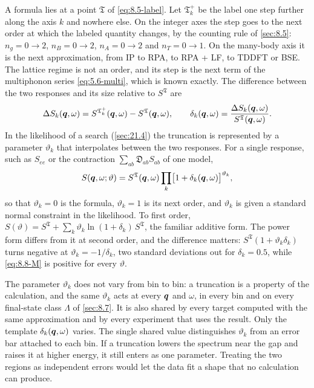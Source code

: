 A formula lies at a point $\mathfrak{T}$ of \cref{eq:8.5-label}. Let $\mathfrak{T}_k^+$ be the label one step further along the axis $k$ and nowhere else. On the integer axes the step goes to the next order at which the labeled quantity changes, by the counting rule of \cref{sec:8.5}: $n_g = 0 \to 2$, $n_B = 0 \to 2$, $n_A = 0 \to 2$ and $n_T = 0 \to 1$. On the many-body axis it is the next approximation, from IP to RPA, to RPA + LF, to TDDFT or BSE. The lattice regime is not an order, and its step is the next term of the multiphonon series \cref{eq:5.6-multi}, which is known exactly. The difference between the two responses and its size relative to $S^{\mathfrak{T}}$ are
\begin{equation}
  \Delta S_k(\bm{q},\omega) = S^{\mathfrak{T}_k^+}(\bm{q},\omega) - S^{\mathfrak{T}}(\bm{q},\omega) , \qquad
  \delta_k(\bm{q},\omega) = \frac{\Delta S_k(\bm{q},\omega)}{S^{\mathfrak{T}}(\bm{q},\omega)} .
  \label{eq:8.8-delta}
\end{equation}
In the likelihood of a search (\cref{sec:21.4}) the truncation is represented by a parameter $\vartheta_k$ that interpolates between the two responses. For a single response, such as $S_{ee}$ or the contraction $\sum_{ab}\mathfrak{D}_{ab}S_{ab}$ of one model,
\begin{equation}
  S(\bm{q},\omega;\vartheta) = S^{\mathfrak{T}}(\bm{q},\omega)\prod_k\bigl[1 + \delta_k(\bm{q},\omega)\bigr]^{\vartheta_k} ,
  \label{eq:8.8-M}
\end{equation}
so that $\vartheta_k = 0$ is the formula, $\vartheta_k = 1$ is its next order, and $\vartheta_k$ is given a standard normal constraint in the likelihood. To first order, $S(\vartheta) = S^{\mathfrak{T}} + \sum_k\vartheta_k\ln(1 + \delta_k)\,S^{\mathfrak{T}}$, the familiar additive form. The power form differs from it at second order, and the difference matters: $S^{\mathfrak{T}}(1 + \vartheta_k\delta_k)$ turns negative at $\vartheta_k = -1/\delta_k$, two standard deviations out for $\delta_k = 0.5$, while \cref{eq:8.8-M} is positive for every $\vartheta$.

The parameter $\vartheta_k$ does not vary from bin to bin: a truncation is a property of the calculation, and the same $\vartheta_k$ acts at every $\bm{q}$ and $\omega$, in every bin and on every final-state class $\Lambda$ of \cref{sec:8.7}. It is also shared by every target computed with the same approximation and by every experiment that uses the result. Only the template $\delta_k(\bm{q},\omega)$ varies. The single shared value distinguishes $\vartheta_k$ from an error bar attached to each bin. If a truncation lowers the spectrum near the gap and raises it at higher energy, it still enters as one parameter. Treating the two regions as independent errors would let the data fit a shape that no calculation can produce.

